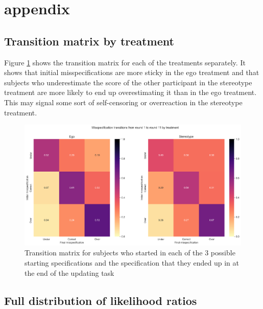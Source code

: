 \documentclass[
  12pt,
]{article}
\begin{document}
\newpage
\appendix

\hypertarget{appendix}{%
\section{appendix}\label{appendix}}

\hypertarget{transition-matrix-by-treatment}{%
\subsection{Transition matrix by
treatment}\label{transition-matrix-by-treatment}}

Figure \ref{fig:transitions-treatment} shows the transition matrix for
each of the treatments separately. It shows that initial
misspecifications are more sticky in the ego treatment and that subjects
who underestimate the score of the other participant in the stereotype
treatment are more likely to end up overestimating it than in the ego
treatment. This may signal some sort of self-censoring or overreaction
in the stereotype treatment.

\begin{figure}
\hypertarget{fig:transitions-treatment}{%
\centering
\includegraphics{../figures/misspecification_transitions_treatment.png}
\caption{Transition matrix for subjects who started in each of the 3
possible starting specifications and the specification that they ended
up in at the end of the updating task}\label{fig:transitions-treatment}
}
\end{figure}

\hypertarget{full-distribution-of-likelihood-ratios}{%
\subsection{Full distribution of likelihood
ratios}\label{full-distribution-of-likelihood-ratios}}
\end{document}
